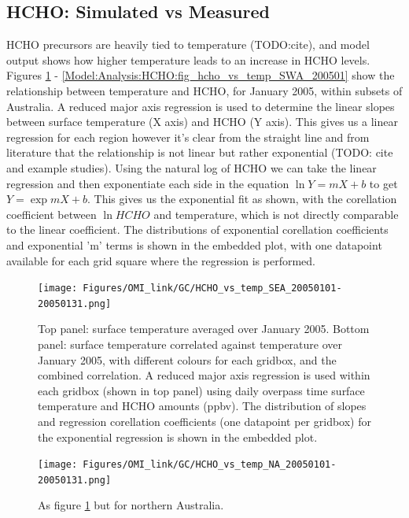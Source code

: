   \subsection{HCHO: Simulated vs Measured}
  \label{Model:Analysis:HCHO}
    
    HCHO precursors are heavily tied to temperature (TODO:cite), and model output shows how higher temperature leads to an increase in HCHO levels.
    Figures \ref{Model:Analysis:HCHO:fig_hcho_vs_temp_SEA_200501} - \ref{Model:Analysis:HCHO:fig_hcho_vs_temp_SWA_200501} show the relationship between temperature and HCHO, for January 2005, within subsets of Australia.
    A reduced major axis regression is used to determine the linear slopes between surface temperature (X axis) and HCHO (Y axis).
    This gives us a linear regression for each region however it's clear from the straight line and from literature that the relationship is not linear but rather exponential (TODO: cite and example studies).
    Using the natural log of HCHO we can take the linear regression and then exponentiate each side in the equation $\ln{Y} = m{X}+b$ to get ${Y} = \exp{m{X}+b}$. 
    This gives us the exponential fit as shown, with the corellation coefficient between $\ln{HCHO}$ and temperature, which is not directly comparable to the linear coefficient.
    The distributions of exponential corellation coefficients and exponential 'm' terms is shown in the embedded plot, with one datapoint available for each grid square where the regression is performed.
    
    
    \begin{figure}
      \texttt{[image: Figures/OMI\_link/GC/HCHO\_vs\_temp\_SEA\_20050101-20050131.png]}
      \caption{%
        Top panel: surface temperature averaged over January 2005.
        Bottom panel: surface temperature correlated against temperature over January 2005, with different colours for each gridbox, and the combined correlation. 
        A reduced major axis regression is used within each gridbox (shown in top panel) using daily overpass time surface temperature and HCHO amounts (ppbv).
        The distribution of slopes and regression corellation coefficients (one datapoint per gridbox) for the exponential regression is shown in the embedded plot.
      }
      \label{Model:Analysis:HCHO:fig_hcho_vs_temp_SEA_200501}
    \end{figure}
    
    \begin{figure}
      \texttt{[image: Figures/OMI\_link/GC/HCHO\_vs\_temp\_NA\_20050101-20050131.png]}
      \caption{%
        As figure \ref{Model:Analysis:HCHO:fig_hcho_vs_temp_SEA_200501} but for northern Australia.
      }
      \label{Model:Analysis:HCHO:fig_hcho_vs_temp_NA_200501}
    \end{figure}
    
